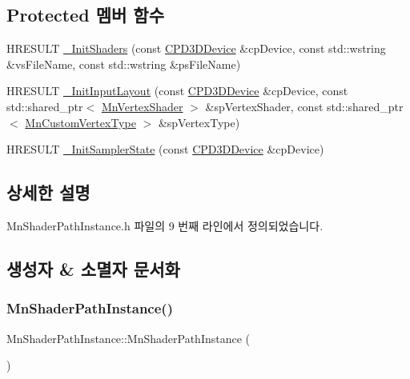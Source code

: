\subsection*{Protected 멤버 함수}
\begin{DoxyCompactItemize}
\item 
H\+R\+E\+S\+U\+LT \hyperlink{class_m_n_l_1_1_mn_shader_path_instance_a3377d96f2cc09e9a42b5c1f2dc0597c5}{\+\_\+\+Init\+Shaders} (const \hyperlink{namespace_m_n_l_a1eec210db8f309a4a9ac0d9658784c31}{C\+P\+D3\+D\+Device} \&cp\+Device, const std\+::wstring \&vs\+File\+Name, const std\+::wstring \&ps\+File\+Name)
\item 
H\+R\+E\+S\+U\+LT \hyperlink{class_m_n_l_1_1_mn_shader_path_instance_aa4f732a781ec94aa1d15b0d5a8d37f6e}{\+\_\+\+Init\+Input\+Layout} (const \hyperlink{namespace_m_n_l_a1eec210db8f309a4a9ac0d9658784c31}{C\+P\+D3\+D\+Device} \&cp\+Device, const std\+::shared\+\_\+ptr$<$ \hyperlink{class_m_n_l_1_1_mn_vertex_shader}{Mn\+Vertex\+Shader} $>$ \&sp\+Vertex\+Shader, const std\+::shared\+\_\+ptr$<$ \hyperlink{class_m_n_l_1_1_mn_custom_vertex_type}{Mn\+Custom\+Vertex\+Type} $>$ \&sp\+Vertex\+Type)
\item 
H\+R\+E\+S\+U\+LT \hyperlink{class_m_n_l_1_1_mn_shader_path_instance_addb282448e424f98db7fc6cabc8c837a}{\+\_\+\+Init\+Sampler\+State} (const \hyperlink{namespace_m_n_l_a1eec210db8f309a4a9ac0d9658784c31}{C\+P\+D3\+D\+Device} \&cp\+Device)
\end{DoxyCompactItemize}


\subsection{상세한 설명}


Mn\+Shader\+Path\+Instance.\+h 파일의 9 번째 라인에서 정의되었습니다.



\subsection{생성자 \& 소멸자 문서화}
\mbox{\label{class_m_n_l_1_1_mn_shader_path_instance_a9dbd10bb88382ec183a3ce9711bd80c0}} 
\subsubsection{\texorpdfstring{Mn\+Shader\+Path\+Instance()}{MnShaderPathInstance()}}
{\footnotesize\ttfamily Mn\+Shader\+Path\+Instance\+::\+Mn\+Shader\+Path\+Instance (\begin{DoxyParamCaption}{ }\end{DoxyParamCaption})}



